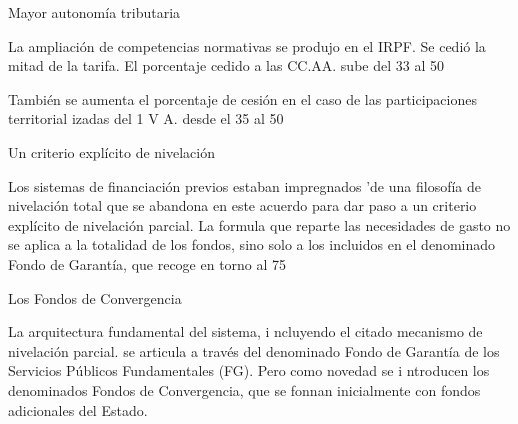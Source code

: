 \documentclass[10pt,a4paper]{article}
\begin{document}
Mayor autonomía tributaria

La ampliación de competencias normativas se produjo en el IRPF. Se cedió la mitad de la tarifa.  El porcentaje cedido a las CC.AA. sube del 33 al 50%

También se aumenta el porcentaje de cesión en el caso de las participaciones territorial izadas del 1 V A. desde el 35 al 50%

Un criterio explícito de nivelación

Los sistemas de financiación previos estaban impregnados 'de una filosofía de nivelación total que se abandona en este acuerdo para dar paso a un criterio explícito de nivelación parcial. La formula que reparte las necesidades de gasto no se aplica a la totalidad de los fondos, sino solo a los incluidos en el denominado Fondo de Garantía, que recoge en torno al 75%

Los Fondos de Convergencia

La arquitectura fundamental del sistema, i ncluyendo el citado mecanismo de nivelación parcial. se articula a través del denominado Fondo de Garantía de los Servicios Públicos Fundamentales (FG). Pero como novedad se i ntroducen los denominados Fondos de Convergencia, que se fonnan inicialmente con fondos adicionales del Estado.
\end{document}
